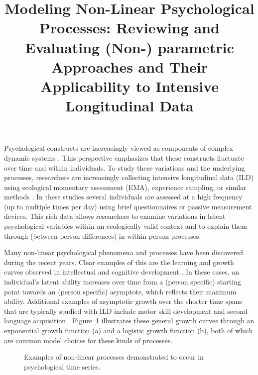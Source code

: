 \documentclass[man, floatsintext]{apa7}
\title{Modeling Non-Linear Psychological Processes: Reviewing and Evaluating
  (Non-) parametric Approaches and Their Applicability to Intensive
  Longitudinal
  Data}
\begin{document}
\maketitle

Psychological constructs are increasingly viewed as components of complex
dynamic systems \parencite{nesselroade_studying_2004, wang_investigating_2012}.
This perspective emphasizes that these constructs fluctuate over time and
within
individuals. To study these variations and the underlying processes,
researchers are increasingly collecting intensive longitudinal data (ILD) using
ecological momentary assessment (EMA), experience sampling, or similar methods
\parencite{fritz_so_2023}. In
these studies several individuals are assessed at a high
frequency (up to multiple times per day) using brief questionnaires or
passive measurement devices. This rich data allows researchers to examine
variations in latent psychological variables within an ecologically valid
context and to explain them through (between-person differences)
in within-person processes.

Many non-linear psychological phenomena and processes have been discovered
during the
recent years. Clear examples of this are the learning and growth curves
observed in intellectual and cognitive development
\parencite{kunnen_dynamic_2012, mcardle_comparative_2002}. In these cases, an
individual's latent ability increases over time from a (person specific)
starting point towards an (person specific) asymptote,
which reflects their maximum ability. Additional examples of
asymptotic growth over the shorter time spans that are typically studied with
ILD include
motor skill development \parencite{newell_time_2001} and second language
acquisition \parencite{de_bot_dynamic_2007}. Figure~\ref{fig:examplar_npn}
illustrates these general growth curves through an exponential growth
function (a) and a logistic growth function (b), both of which are common
model choices for these kinds of processes.

\begin{figure}[!ht]
  \caption{Examples of non-linear processes demonstrated to occur in
    psychological time series.}
  \label{fig:examplar_npn}
\end{figure}
\end{document}

